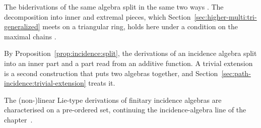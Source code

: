 The biderivations of the same algebra split in the same two ways
\cite[p.~13]{GuanZhang2024}. The decomposition into inner and extremal pieces,
which Section~\ref{sec:higher-multi:tri-generalized} meets on a triangular
ring, holds here under a condition on the maximal chains
\cite[Theorem~4.10, p.~13]{GuanZhang2024}.

By Proposition~\ref{prop:incidence:split}, the derivations of an incidence algebra
split into an inner part and a part read from an additive function. A trivial
extension is a second construction that puts two algebras together, and
Section~\ref{sec:path-incidence:trivial-extension} treats it.

The (non-)linear Lie-type derivations of finitary incidence algebras are characterised on a pre-ordered set, continuing the incidence-algebra line of the chapter~\cite{WlNonlinearLieTypeDerivationsOfF2020}.
